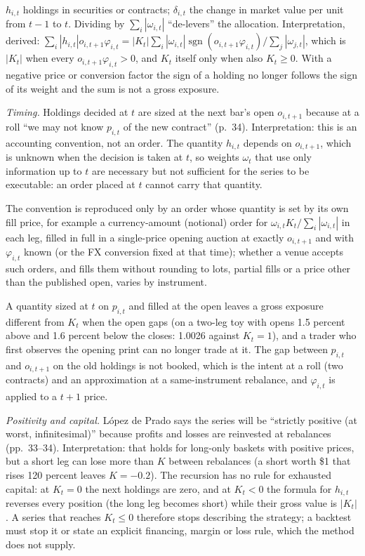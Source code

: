 \begin{qfmethod}
 $h_{i,t}$ holdings in securities or contracts; $\delta_{i,t}$ the change in market value per unit from $t-1$ to $t$. Dividing by $\sum_i|\omega_{i,t}|$ ``de-levers'' the allocation. Interpretation, derived: $\sum_i|h_{i,t}|o_{i,t+1}\varphi_{i,t}=|K_t|\sum_i|\omega_{i,t}|\operatorname{sgn}(o_{i,t+1}\varphi_{i,t})/\sum_j|\omega_{j,t}|$, which is $|K_t|$ when every $o_{i,t+1}\varphi_{i,t}>0$, and $K_t$ itself only when also $K_t\ge0$. With a negative price or conversion factor the sign of a holding no longer follows the sign of its weight and the sum is not a gross exposure.

 \emph{Timing.} Holdings decided at $t$ are sized at the next bar's open $o_{i,t+1}$ because at a roll ``we may not know $p_{i,t}$ of the new contract'' (p.~34). Interpretation: this is an accounting convention, not an order. The quantity $h_{i,t}$ depends on $o_{i,t+1}$, which is unknown when the decision is taken at $t$, so weights $\omega_t$ that use only information up to $t$ are necessary but not sufficient for the series to be executable: an order placed at $t$ cannot carry that quantity.

The convention is reproduced only by an order whose quantity is set by its own fill price, for example a currency-amount (notional) order for $\omega_{i,t}K_t/\sum_i|\omega_{i,t}|$ in each leg, filled in full in a single-price opening auction at exactly $o_{i,t+1}$ and with $\varphi_{i,t}$ known (or the FX conversion fixed at that time); whether a venue accepts such orders, and fills them without rounding to lots, partial fills or a price other than the published open, varies by instrument.

A quantity sized at $t$ on $p_{i,t}$ and filled at the open leaves a gross exposure different from $K_t$ when the open gaps (on a two-leg toy with opens 1.5 percent above and 1.6 percent below the closes: 1.0026 against $K_t=1$), and a trader who first observes the opening print can no longer trade at it. The gap between $p_{i,t}$ and $o_{i,t+1}$ on the old holdings is not booked, which is the intent at a roll (two contracts) and an approximation at a same-instrument rebalance, and $\varphi_{i,t}$ is applied to a $t+1$ price.

\emph{Positivity and capital.} López de Prado says the series will be ``strictly positive (at worst, infinitesimal)'' because profits and losses are reinvested at rebalances (pp.~33--34). Interpretation: that holds for long-only baskets with positive prices, but a short leg can lose more than $K$ between rebalances (a short worth \$1 that rises 120 percent leaves $K=-0.2$). The recursion has no rule for exhausted capital: at $K_t=0$ the next holdings are zero, and at $K_t<0$ the formula for $h_{i,t}$ reverses every position (the long leg becomes short) while their gross value is $|K_t|$. A series that reaches $K_t\le0$ therefore stops describing the strategy; a backtest must stop it or state an explicit financing, margin or loss rule, which the method does not supply.


\end{qfmethod}
